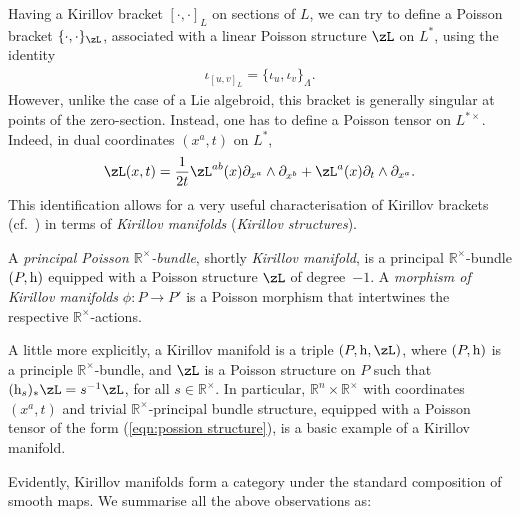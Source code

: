 \documentclass[10pt,a4paper]{amsart}
\newcommand{\rmh}{\textnormal{h}}
\newcommand{\R}{{\mathbb R}}
\newcommand{\we}{\wedge}
\newcommand{\pa}{\partial}
\newcommand{\ti}{\times}
\def\Rt{{\R^\times}}
\numberwithin{equation}{section}
\begin{document}
Having a Kirillov bracket $[\cdot,\cdot]_L$ on sections of $L$, we can try to def\/ine a Poisson bracket $\{\cdot,\cdot\}_\zL$, associated with a linear Poisson structure $\zL$ on $L^*$, using the identity
\begin{gather}\label{e1}
\iota_{[u, v]_{L}} = \{\iota_{u}, \iota_{v}\}_{\Lambda}.
\end{gather}
However, unlike the case of a Lie algebroid, this bracket is generally singular at points of the zero-section. Instead, one has to def\/ine a Poisson tensor on $L^{*\ti}$. Indeed, in dual coordinates $(x^a,t)$ on $L^*$,
\begin{gather}\label{eqn:possion structure}
\zL(x,t)=\frac{1}{2t}\zL^{ab}(x)\pa_{x^a}\we\pa_{x^b}+\zL^a(x)\pa_t\we\pa_{x^a}.
\end{gather}
This identif\/ication allows for a very useful characterisation of Kirillov brackets (cf.~\cite{Grabowski2013, Marle:1991}) in terms of \emph{Kirillov manifolds} (\emph{Kirillov structures}).

\begin{Definition} A \emph{principal Poisson $\R^\ti$-bundle}, shortly \emph{Kirillov manifold}, is a principal $\R^\ti$-bundle $(P,\rmh)$ equipped with a Poisson structure $\zL$ of degree~$-1$. A \emph{morphism of Kirillov manifolds} $\phi\colon P\rightarrow P'$ is a Poisson morphism that intertwines the respective $\R^\ti$-actions.
\end{Definition}

A little more explicitly, a Kirillov manifold is a triple $(P, \rmh, \zL)$, where $(P, \rmh)$ is a principle $\R^\times$-bundle, and $\zL$ is a Poisson structure on $P$ such that $(\rmh_s)_* \zL = s^{-1}\zL$, for all $s \in \R^\times$. In particular, $\R^n\ti\R^\ti$ with coordinates $(x^a,t)$ and trivial $\Rt$-principal bundle structure, equipped with a Poisson tensor of the form (\ref{eqn:possion structure}), is a basic example of a Kirillov manifold.\par

Evidently, Kirillov manifolds form a category under the standard composition of smooth maps. We summarise all the above observations as:
\end{document}
